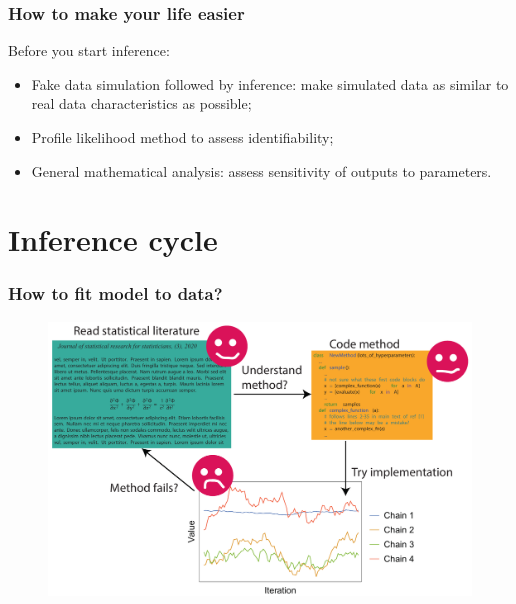 \documentclass[handout]{beamer}
\begin{document}
\begin{frame}
	\frametitle{How to make your life easier}
	
	Before you start inference:
	
	\begin{itemize}
		\item Fake data simulation followed by inference: make simulated data as similar to real data characteristics as possible;
		\item Profile likelihood method to assess identifiability;
		\item General mathematical analysis: assess sensitivity of outputs to parameters.
	\end{itemize}
\end{frame}

\section{Inference cycle}
\frame{\tableofcontents[currentsection]}

\begin{frame}
	\frametitle{How to fit model to data?}
	
	\begin{figure}
		\centerline{\includegraphics[width=1\textwidth]{./Figures/student_cycle.pdf}}
	\end{figure}
	
\end{frame}
\end{document}
